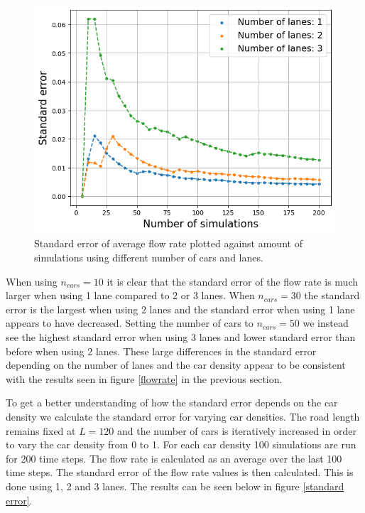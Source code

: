 \documentclass[a4paper,12pt]{article}
\begin{document}
\begin{figure}[H]
\begin{minipage}{.5\textwidth}
        \includegraphics[scale=0.47]{Images/standard error 50 cars 120.png}
    \end{minipage}%
    \caption{Standard error of average flow rate plotted against amount of simulations using different number of cars and lanes.}
    \label{standard error 1}
\end{figure}

When using $n_{cars}=10$ it is clear that the standard error of the flow rate is much larger when using 1 lane compared to 2 or 3 lanes.
When $n_{cars}=30$ the standard error is the largest when using 2 lanes and the standard error when using 1 lane appears to have decreased.
Setting the number of cars to $n_{cars}=50$ we instead see the highest standard error when using 3 lanes and lower standard error than before 
when using 2 lanes. These large differences in the standard error depending on the number of lanes and the car density appear to 
be consistent with the results seen in figure \ref*{flowrate} in the previous section.

To get a better understanding of how the standard error depends on the car density we calculate the standard error for varying car densities.
The road length remains fixed at $L=120$ and the number of cars is iteratively increased in order to vary the car density from 0 to 1. For each car density 100 simulations are run
for 200 time steps. The flow rate is calculated as an average over the last 100 time steps. The standard error of the flow rate values is then calculated.
This is done using 1, 2 and 3 lanes. The results can be seen below in figure \ref*{standard error}.
\end{document}
